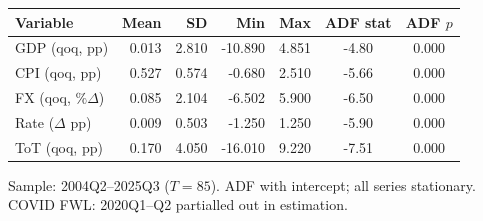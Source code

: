 
\begin{tabular}{lrrrrcc}
\toprule
Variable & Mean & SD & Min & Max & ADF stat & ADF $p$ \\
\midrule
    GDP (qoq, pp) & 0.013 & 2.810 & -10.890 & 4.851 & -4.80 & 0.000 \\
    CPI (qoq, pp) & 0.527 & 0.574 & -0.680 & 2.510 & -5.66 & 0.000 \\
    FX (qoq, $\%\Delta$) & 0.085 & 2.104 & -6.502 & 5.900 & -6.50 & 0.000 \\
    Rate ($\Delta$ pp) & 0.009 & 0.503 & -1.250 & 1.250 & -5.90 & 0.000 \\
    ToT (qoq, pp) & 0.170 & 4.050 & -16.010 & 9.220 & -7.51 & 0.000 \\
\bottomrule
\end{tabular}
\begin{tablenotes}
\small Sample: 2004Q2--2025Q3 ($T=85$). ADF with intercept; all series stationary.
COVID FWL: 2020Q1--Q2 partialled out in estimation.
\end{tablenotes}
